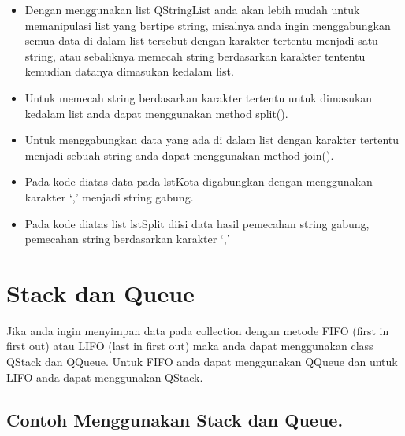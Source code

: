 \begin{itemize}

\item
  Dengan menggunakan list QStringList anda akan lebih mudah untuk
  memanipulasi list yang bertipe string, misalnya anda ingin
  menggabungkan semua data di dalam list tersebut dengan karakter
  tertentu menjadi satu string, atau sebaliknya memecah string
  berdasarkan karakter tententu kemudian datanya dimasukan kedalam list.
\item
  Untuk memecah string berdasarkan karakter tertentu untuk dimasukan
  kedalam list anda dapat menggunakan method split().
\item
  Untuk menggabungkan data yang ada di dalam list dengan karakter
  tertentu menjadi sebuah string anda dapat menggunakan method join().
\item
  Pada kode diatas data pada lstKota digabungkan dengan menggunakan
  karakter `,' menjadi string gabung.
\item
  Pada kode diatas list lstSplit diisi data hasil pemecahan string
  gabung, pemecahan string berdasarkan karakter `,'
\end{itemize}

\section{Stack dan Queue}\label{stack-dan-queue}

Jika anda ingin menyimpan data pada collection dengan metode FIFO (first
in first out) atau LIFO (last in first out) maka anda dapat menggunakan
class QStack dan QQueue. Untuk FIFO anda dapat menggunakan QQueue dan
untuk LIFO anda dapat menggunakan QStack.

\subsection*{Contoh Menggunakan Stack dan Queue.}

